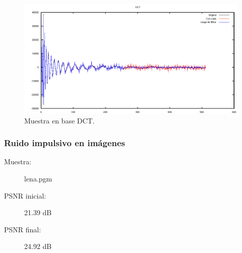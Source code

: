 \documentclass[a4paper,10pt,twoside]{article}
\begin{document}
\begin{figure}[H]
  \centering
  \includegraphics[width=15cm]{graficos/dopp_impulsivo_umbralizar_dct.png} 
  \caption{Muestra en base DCT.}
\end{figure}


\subsubsection{Ruido impulsivo en imágenes}

\begin{description}
  \item[Muestra:] lena.pgm
  \item[PSNR inicial:] 21.39 dB
  \item[PSNR final:] 24.92 dB
\end{description}
\end{document}

